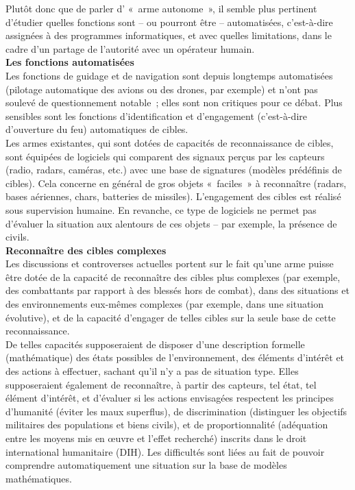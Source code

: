 \documentclass[8pt]{article}
\begin{document}
Plutôt donc que de parler d’ «~arme autonome~», il semble plus pertinent d’étudier quelles fonctions sont – ou pourront être – automatisées, c’est-à-dire assignées à des programmes informatiques, et avec quelles limitations, dans le cadre d’un partage de l’autorité avec un opérateur humain.\\

\textbf{Les fonctions automatisées}\\

Les fonctions de guidage et de navigation sont depuis longtemps automatisées (pilotage automatique des avions ou des drones, par exemple) et n’ont pas soulevé de questionnement notable~; elles sont non critiques pour ce débat. Plus sensibles sont les fonctions d’identification et d’engagement (c’est-à-dire d’ouverture du feu) automatiques de cibles.\\

Les armes existantes, qui sont dotées de capacités de reconnaissance de cibles, sont équipées de logiciels qui comparent des signaux perçus par les capteurs (radio, radars, caméras, etc.) avec une base de signatures (modèles prédéfinis de cibles). Cela concerne en général de gros objets «~faciles~» à reconnaître (radars, bases aériennes, chars, batteries de missiles). L’engagement des cibles est réalisé sous supervision humaine. En revanche, ce type de logiciels ne permet pas d’évaluer la situation aux alentours de ces objets – par exemple, la présence de civils.\\

\textbf{Reconnaître des cibles complexes}\\

Les discussions et controverses actuelles portent sur le fait qu’une arme puisse être dotée de la capacité de reconnaître des cibles plus complexes (par exemple, des combattants par rapport à des blessés hors de combat), dans des situations et des environnements eux-mêmes complexes (par exemple, dans une situation évolutive), et de la capacité d’engager de telles cibles sur la seule base de cette reconnaissance.\\

De telles capacités supposeraient de disposer d’une description formelle (mathématique) des états possibles de l’environnement, des éléments d’intérêt et des actions à effectuer, sachant qu’il n’y a pas de situation type. Elles supposeraient également de reconnaître, à partir des capteurs, tel état, tel élément d’intérêt, et d’évaluer si les actions envisagées respectent les principes d’humanité (éviter les maux superflus), de discrimination (distinguer les objectifs militaires des populations et biens civils), et de proportionnalité (adéquation entre les moyens mis en œuvre et l’effet recherché) inscrits dans le droit international humanitaire (DIH). Les difficultés sont liées au fait de pouvoir comprendre automatiquement une situation sur la base de modèles mathématiques.\\
\end{document}
